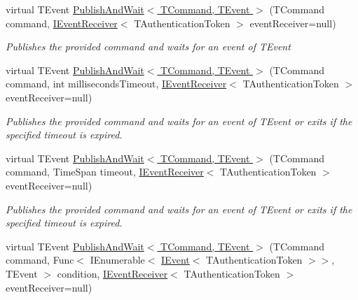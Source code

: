 \begin{DoxyCompactItemize}
\item 
virtual T\+Event \hyperlink{classCqrs_1_1Akka_1_1Commands_1_1AkkaCommandBus_a8e1291f0259ac80e393c02bb119159a5_a8e1291f0259ac80e393c02bb119159a5}{Publish\+And\+Wait$<$ T\+Command, T\+Event $>$} (T\+Command command, \hyperlink{interfaceCqrs_1_1Events_1_1IEventReceiver}{I\+Event\+Receiver}$<$ T\+Authentication\+Token $>$ event\+Receiver=null)
\begin{DoxyCompactList}\small\item\em Publishes the provided {\itshape command}  and waits for an event of {\itshape T\+Event}  \end{DoxyCompactList}\item 
virtual T\+Event \hyperlink{classCqrs_1_1Akka_1_1Commands_1_1AkkaCommandBus_a7f820323e5293e476f4afee7c731f7a3_a7f820323e5293e476f4afee7c731f7a3}{Publish\+And\+Wait$<$ T\+Command, T\+Event $>$} (T\+Command command, int milliseconds\+Timeout, \hyperlink{interfaceCqrs_1_1Events_1_1IEventReceiver}{I\+Event\+Receiver}$<$ T\+Authentication\+Token $>$ event\+Receiver=null)
\begin{DoxyCompactList}\small\item\em Publishes the provided {\itshape command}  and waits for an event of {\itshape T\+Event}  or exits if the specified timeout is expired. \end{DoxyCompactList}\item 
virtual T\+Event \hyperlink{classCqrs_1_1Akka_1_1Commands_1_1AkkaCommandBus_ad50bff025d51c3b00b17ccaec2a4cefc_ad50bff025d51c3b00b17ccaec2a4cefc}{Publish\+And\+Wait$<$ T\+Command, T\+Event $>$} (T\+Command command, Time\+Span timeout, \hyperlink{interfaceCqrs_1_1Events_1_1IEventReceiver}{I\+Event\+Receiver}$<$ T\+Authentication\+Token $>$ event\+Receiver=null)
\begin{DoxyCompactList}\small\item\em Publishes the provided {\itshape command}  and waits for an event of {\itshape T\+Event}  or exits if the specified timeout is expired. \end{DoxyCompactList}\item 
virtual T\+Event \hyperlink{classCqrs_1_1Akka_1_1Commands_1_1AkkaCommandBus_ad318bfb71c5a8f5e13994edce9bad99e_ad318bfb71c5a8f5e13994edce9bad99e}{Publish\+And\+Wait$<$ T\+Command, T\+Event $>$} (T\+Command command, Func$<$ I\+Enumerable$<$ \hyperlink{interfaceCqrs_1_1Events_1_1IEvent}{I\+Event}$<$ T\+Authentication\+Token $>$$>$, T\+Event $>$ condition, \hyperlink{interfaceCqrs_1_1Events_1_1IEventReceiver}{I\+Event\+Receiver}$<$ T\+Authentication\+Token $>$ event\+Receiver=null)
$$
\end{DoxyCompactItemize}

